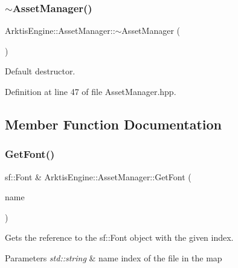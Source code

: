 \subsubsection{\texorpdfstring{$\sim$AssetManager()}{~AssetManager()}}
{\footnotesize\ttfamily Arktis\+Engine\+::\+Asset\+Manager\+::$\sim$\+Asset\+Manager (\begin{DoxyParamCaption}{ }\end{DoxyParamCaption})\hspace{0.3cm}{\ttfamily [inline]}}



Default destructor. 

\begin{DoxyVerb}\end{DoxyVerb}
 

Definition at line 47 of file Asset\+Manager.\+hpp.


\begin{DoxyCode}{0}

\end{DoxyCode}


\subsection{Member Function Documentation}
\mbox{\label{class_arktis_engine_1_1_asset_manager_a5eedae3995e8e86fe49766f42e290dc6}} 
\subsubsection{\texorpdfstring{GetFont()}{GetFont()}}
{\footnotesize\ttfamily sf\+::\+Font \& Arktis\+Engine\+::\+Asset\+Manager\+::\+Get\+Font (\begin{DoxyParamCaption}\item[{std\+::string}]{name }\end{DoxyParamCaption})}



Gets the reference to the sf\+::\+Font object with the given index. 


\begin{DoxyParams}{Parameters}
{\em std\+::string} & name index of the file in the map \begin{DoxyVerb}\end{DoxyVerb}
 \\
\hline
\end{DoxyParams}


